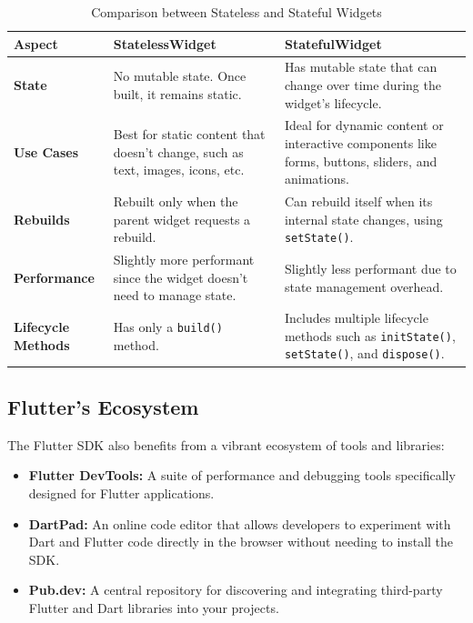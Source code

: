 \documentclass[12pt,a4paper]{report}
\begin{document}
\begin{table}[H]
\centering
\begin{tabular}{|p{4cm}|p{5cm}|p{5cm}|}
\hline
\textbf{Aspect} & \textbf{StatelessWidget} & \textbf{StatefulWidget} \\ \hline
\textbf{State} & No mutable state. Once built, it remains static. & Has mutable state that can change over time during the widget's lifecycle. \\ \hline
\textbf{Use Cases} & Best for static content that doesn’t change, such as text, images, icons, etc. & Ideal for dynamic content or interactive components like forms, buttons, sliders, and animations. \\ \hline
\textbf{Rebuilds} & Rebuilt only when the parent widget requests a rebuild. & Can rebuild itself when its internal state changes, using \texttt{setState()}. \\ \hline
\textbf{Performance} & Slightly more performant since the widget doesn’t need to manage state. & Slightly less performant due to state management overhead. \\ \hline
\textbf{Lifecycle Methods} & Has only a \texttt{build()} method. & Includes multiple lifecycle methods such as \texttt{initState()}, \texttt{setState()}, and \texttt{dispose()}. \\ \hline
\end{tabular}
\caption{Comparison between Stateless and Stateful Widgets}
\end{table}

\subsection{Flutter’s Ecosystem}
The Flutter SDK also benefits from a vibrant ecosystem of tools and libraries:
\begin{itemize}
    \item \textbf{Flutter DevTools:} A suite of performance and debugging tools specifically designed for Flutter applications.
    \item \textbf{DartPad:} An online code editor that allows developers to experiment with Dart and Flutter code directly in the browser without needing to install the SDK.
    \item \textbf{Pub.dev:} A central repository for discovering and integrating third-party Flutter and Dart libraries into your projects.
\end{itemize}
\end{document}
